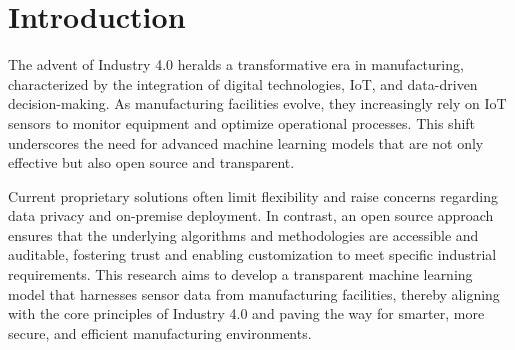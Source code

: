 \chapter{Introduction}
\label{chap:introduction}
\setlength{\parskip}{1em}

The advent of Industry 4.0 heralds a transformative era in manufacturing, characterized by the integration of digital technologies, IoT, and data-driven decision-making. As manufacturing facilities evolve, they increasingly rely on IoT sensors to monitor equipment and optimize operational processes. This shift underscores the need for advanced machine learning models that are not only effective but also open source and transparent.

Current proprietary solutions often limit flexibility and raise concerns regarding data privacy and on-premise deployment. In contrast, an open source approach ensures that the underlying algorithms and methodologies are accessible and auditable, fostering trust and enabling customization to meet specific industrial requirements. This research aims to develop a transparent machine learning model that harnesses sensor data from manufacturing facilities, thereby aligning with the core principles of Industry 4.0 and paving the way for smarter, more secure, and efficient manufacturing environments.
